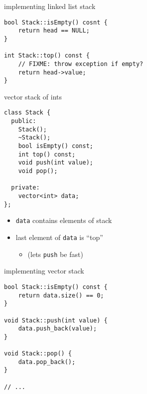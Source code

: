 \begin{frame}[fragile,label=implLLStack]{implementing linked list stack}
\lstset{language=C++,style=small}
\begin{lstlisting}
bool Stack::isEmpty() cosnt {
    return head == NULL;
}

int Stack::top() const {
    // FIXME: throw exception if empty?
    return head->value;
}
\end{lstlisting}
\end{frame}

\begin{frame}[fragile,label=vectorStack]{vector stack of ints}
\lstset{language=C++,style=smaller}
\begin{lstlisting}
class Stack {
  public:
    Stack();
    ~Stack();
    bool isEmpty() const;
    int top() const;
    void push(int value);
    void pop();

  private:
    vector<int> data;
};
\end{lstlisting}
\begin{itemize}
\item \texttt{data} contains elements of stack
\item last element of \texttt{data} is ``top''
    \begin{itemize}
    \item (lets \texttt{push} be fast)
    \end{itemize}
\end{itemize}
\end{frame}

\begin{frame}[fragile,label=vectorStackImpl]{implementing vector stack}
\lstset{language=C++,style=small}
\begin{lstlisting}
bool Stack::isEmpty() const {
    return data.size() == 0;
}

void Stack::push(int value) {
    data.push_back(value);
}

void Stack::pop() {
    data.pop_back();
}

// ...
\end{lstlisting}
\end{frame}

